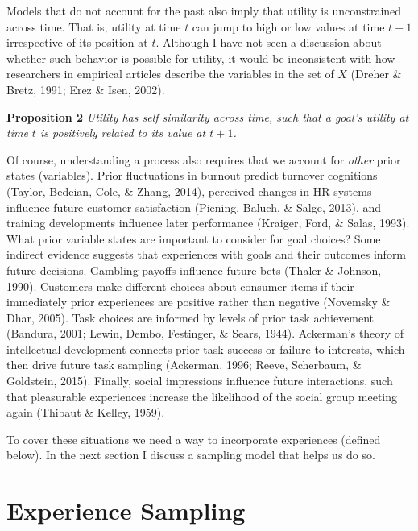 \documentclass[english,,man]{apa6}
\theoremstyle{definition}
\theoremstyle{definition}
\theoremstyle{definition}
\theoremstyle{remark}
\begin{document}
Models that do not account for the past also imply that utility is
unconstrained across time. That is, utility at time \(t\) can jump to
high or low values at time \(t+1\) irrespective of its position at
\(t\). Although I have not seen a discussion about whether such behavior
is possible for utility, it would be inconsistent with how researchers
in empirical articles describe the variables in the set of \(X\) (Dreher
\& Bretz, 1991; Erez \& Isen, 2002).

\textbf{Proposition 2} \emph{Utility has self similarity across time,
such that a goal's utility at time \(t\) is positively related to its
value at \(t + 1\).}

Of course, understanding a process also requires that we account for
\emph{other} prior states (variables). Prior fluctuations in burnout
predict turnover cognitions (Taylor, Bedeian, Cole, \& Zhang, 2014),
perceived changes in HR systems influence future customer satisfaction
(Piening, Baluch, \& Salge, 2013), and training developments influence
later performance (Kraiger, Ford, \& Salas, 1993). What prior variable
states are important to consider for goal choices? Some indirect
evidence suggests that experiences with goals and their outcomes inform
future decisions. Gambling payoffs influence future bets (Thaler \&
Johnson, 1990). Customers make different choices about consumer items if
their immediately prior experiences are positive rather than negative
(Novemsky \& Dhar, 2005). Task choices are informed by levels of prior
task achievement (Bandura, 2001; Lewin, Dembo, Festinger, \& Sears,
1944). Ackerman's theory of intellectual development connects prior task
success or failure to interests, which then drive future task sampling
(Ackerman, 1996; Reeve, Scherbaum, \& Goldstein, 2015). Finally, social
impressions influence future interactions, such that pleasurable
experiences increase the likelihood of the social group meeting again
(Thibaut \& Kelley, 1959).

To cover these situations we need a way to incorporate experiences
(defined below). In the next section I discuss a sampling model that
helps us do so.

\hypertarget{experience-sampling}{%
\section{Experience Sampling}\label{experience-sampling}}
\end{document}
